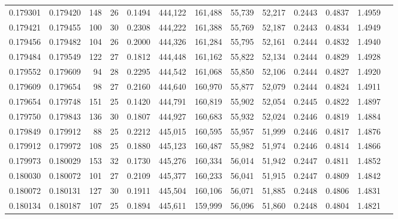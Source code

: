 \begin{tabular}{rrrrrrrrrrrrr}
0.179301 & 0.179420 & 148 &  26 &                                     0.1494 & 444,122 & 161,488 &  55,739 &  52,217 & 0.2443 & 0.4837 & 1.4959 \\
0.179421 & 0.179455 & 100 &  30 &                                     0.2308 & 444,222 & 161,388 &  55,769 &  52,187 & 0.2443 & 0.4834 & 1.4949 \\
0.179456 & 0.179482 & 104 &  26 &                                     0.2000 & 444,326 & 161,284 &  55,795 &  52,161 & 0.2444 & 0.4832 & 1.4940 \\
0.179484 & 0.179549 & 122 &  27 &                                     0.1812 & 444,448 & 161,162 &  55,822 &  52,134 & 0.2444 & 0.4829 & 1.4928 \\
0.179552 & 0.179609 &  94 &  28 &                                     0.2295 & 444,542 & 161,068 &  55,850 &  52,106 & 0.2444 & 0.4827 & 1.4920 \\
0.179609 & 0.179654 &  98 &  27 &                                     0.2160 & 444,640 & 160,970 &  55,877 &  52,079 & 0.2444 & 0.4824 & 1.4911 \\
0.179654 & 0.179748 & 151 &  25 &                                     0.1420 & 444,791 & 160,819 &  55,902 &  52,054 & 0.2445 & 0.4822 & 1.4897 \\
0.179750 & 0.179843 & 136 &  30 &                                     0.1807 & 444,927 & 160,683 &  55,932 &  52,024 & 0.2446 & 0.4819 & 1.4884 \\
0.179849 & 0.179912 &  88 &  25 &                                     0.2212 & 445,015 & 160,595 &  55,957 &  51,999 & 0.2446 & 0.4817 & 1.4876 \\
0.179912 & 0.179972 & 108 &  25 &                                     0.1880 & 445,123 & 160,487 &  55,982 &  51,974 & 0.2446 & 0.4814 & 1.4866 \\
0.179973 & 0.180029 & 153 &  32 &                                     0.1730 & 445,276 & 160,334 &  56,014 &  51,942 & 0.2447 & 0.4811 & 1.4852 \\
0.180030 & 0.180072 & 101 &  27 &                                     0.2109 & 445,377 & 160,233 &  56,041 &  51,915 & 0.2447 & 0.4809 & 1.4842 \\
0.180072 & 0.180131 & 127 &  30 &                                     0.1911 & 445,504 & 160,106 &  56,071 &  51,885 & 0.2448 & 0.4806 & 1.4831 \\
0.180134 & 0.180187 & 107 &  25 &                                     0.1894 & 445,611 & 159,999 &  56,096 &  51,860 & 0.2448 & 0.4804 & 1.4821 \\

\end{tabular}
